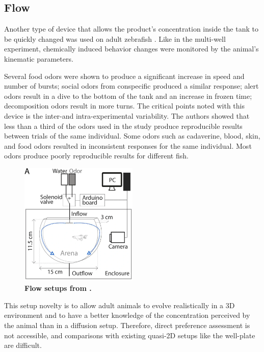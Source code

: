     \subsection{Flow}
    Another type of device that allows the product's concentration inside the tank to be quickly changed was used on adult zebrafish \cite{kermen2020stimulus}. Like in the multi-well experiment, chemically induced behavior changes were monitored by the animal's kinematic parameters.

    Several food odors were shown to produce a significant increase in speed and number of bursts; social odors from conspecific produced a similar response; alert odors result in a dive to the bottom of the tank and an increase in frozen time; decomposition odors result in more turns. The critical points noted with this device is the inter-and intra-experimental variability. The authors showed that less than a third of the odors used in the study produce reproducible results between trials of the same individual. Some odors such as cadaverine, blood, skin, and food odors resulted in inconsistent responses for the same individual. Most odors produce poorly reproducible results for different fish.

    \begin{figure}[h]
      \centering
      \includegraphics[width=0.5\textwidth]{part_2/assets/flow_1.png}
      \caption{\textbf{Flow setups from \cite{kermen2020stimulus}.}}
      \label{flow_1_setup}
    \end{figure}

    This setup novelty is to allow adult animals to evolve realistically in a 3D environment and to have a better knowledge of the concentration perceived by the animal than in a diffusion setup. Therefore, direct preference assessment is not accessible, and comparisons with existing quasi-2D setups like the well-plate are difficult.

